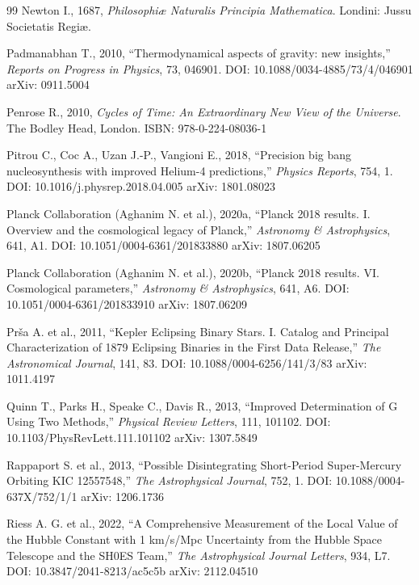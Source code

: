 \documentclass[10pt,a4paper]{article}
\begin{document}
\begin{thebibliography}{99}
Newton I., 1687, \emph{Philosophiæ Naturalis Principia Mathematica}. Londini: Jussu Societatis Regiæ.

Padmanabhan T., 2010, ``Thermodynamical aspects of gravity: new insights,'' \emph{Reports on Progress in Physics}, 73, 046901. DOI: 10.1088/0034-4885/73/4/046901 arXiv: 0911.5004

Penrose R., 2010, \emph{Cycles of Time: An Extraordinary New View of the Universe}. The Bodley Head, London. ISBN: 978-0-224-08036-1

Pitrou C., Coc A., Uzan J.-P., Vangioni E., 2018, ``Precision big bang nucleosynthesis with improved Helium-4 predictions,'' \emph{Physics Reports}, 754, 1. DOI: 10.1016/j.physrep.2018.04.005 arXiv: 1801.08023

Planck Collaboration (Aghanim N. et al.), 2020a, ``Planck 2018 results. I. Overview and the cosmological legacy of Planck,'' \emph{Astronomy \& Astrophysics}, 641, A1. DOI: 10.1051/0004-6361/201833880 arXiv: 1807.06205

Planck Collaboration (Aghanim N. et al.), 2020b, ``Planck 2018 results. VI. Cosmological parameters,'' \emph{Astronomy \& Astrophysics}, 641, A6. DOI: 10.1051/0004-6361/201833910 arXiv: 1807.06209

Prša A. et al., 2011, ``Kepler Eclipsing Binary Stars. I. Catalog and Principal Characterization of 1879 Eclipsing Binaries in the First Data Release,'' \emph{The Astronomical Journal}, 141, 83. DOI: 10.1088/0004-6256/141/3/83 arXiv: 1011.4197

Quinn T., Parks H., Speake C., Davis R., 2013, ``Improved Determination of G Using Two Methods,'' \emph{Physical Review Letters}, 111, 101102. DOI: 10.1103/PhysRevLett.111.101102 arXiv: 1307.5849

Rappaport S. et al., 2013, ``Possible Disintegrating Short-Period Super-Mercury Orbiting KIC 12557548,'' \emph{The Astrophysical Journal}, 752, 1. DOI: 10.1088/0004-637X/752/1/1 arXiv: 1206.1736

Riess A. G. et al., 2022, ``A Comprehensive Measurement of the Local Value of the Hubble Constant with 1 km/s/Mpc Uncertainty from the Hubble Space Telescope and the SH0ES Team,'' \emph{The Astrophysical Journal Letters}, 934, L7. DOI: 10.3847/2041-8213/ac5c5b arXiv: 2112.04510


\end{thebibliography}
\end{document}
